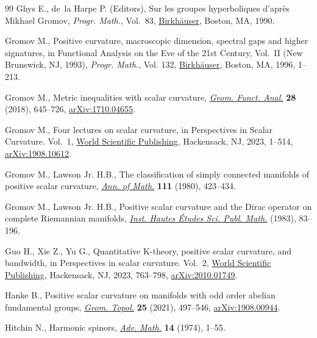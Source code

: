 \begin{thebibliography}{99}
Ghys E., de~la Harpe P. (Editors), Sur les groupes hyperboliques d'apr\`es
 {M}ikhael {G}romov, \textit{Progr. Math.}, Vol.~83, \href{https://doi.org/10.1007/978-1-4684-9167-8}{Birkh\"auser}, Boston, MA,
 1990.

Gromov M., Positive curvature, macroscopic dimension, spectral gaps and higher
 signatures, in Functional {A}nalysis on the {E}ve of the 21st {C}entury,
 {V}ol.~{II} ({N}ew {B}runswick, {NJ}, 1993), \textit{Progr. Math.}, Vol. 132,
  \href{https://doi.org/10.1007/978-1-4612-4098-3_1}{Birkh\"auser}, Boston, MA, 1996, 1--213.

Gromov M., Metric inequalities with scalar curvature, \href{https://doi.org/10.1007/s00039-018-0453-z}{\textit{Geom. Funct.
 Anal.}} \textbf{28} (2018), 645--726, \href{https://arxiv.org/abs/1710.04655}{arXiv:1710.04655}.

Gromov M., Four lectures on scalar curvature, in Perspectives in {S}calar
 {C}urvature. {V}ol.~1, \href{https://doi.org/10.1142/97898112732230001}{World Scientific Publishing}, Hackensack, NJ, 2023,
 1--514, \href{https://arxiv.org/abs/1908.10612}{arXiv:1908.10612}.

Gromov M., Lawson Jr. H.B., The classification of simply connected manifolds of
 positive scalar curvature, \href{https://doi.org/10.2307/1971103}{\textit{Ann. of Math.}} \textbf{111} (1980),
 423--434.

Gromov M., Lawson Jr. H.B., Positive scalar curvature and the {D}irac operator
 on complete {R}iemannian manifolds, \href{https://doi.org/10.1007/BF02953774}{\textit{Inst. Hautes \'Etudes Sci. Publ.
 Math.}} (1983), 83--196.

Guo H., Xie Z., Yu G., Quantitative {K}-theory, positive scalar curvature, and
 bandwidth, in Perspectives in scalar curvature. {V}ol.~2, \href{https://doi.org/10.1142/12644-vol2}{World Scientific
 Publishing}, Hackensack, NJ, 2023, 763--798, \href{https://arxiv.org/abs/2010.01749}{arXiv:2010.01749}.

Hanke B., Positive scalar curvature on manifolds with odd order abelian
 fundamental groups, \href{https://doi.org/10.2140/gt.2021.25.497}{\textit{Geom. Topol.}} \textbf{25} (2021), 497--546,
 \href{https://arxiv.org/abs/1908.00944}{arXiv:1908.00944}.

Hitchin N., Harmonic spinors, \href{https://doi.org/10.1016/0001-8708(74)90021-8}{\textit{Adv. Math.}} \textbf{14} (1974), 1--55.


\end{thebibliography}
